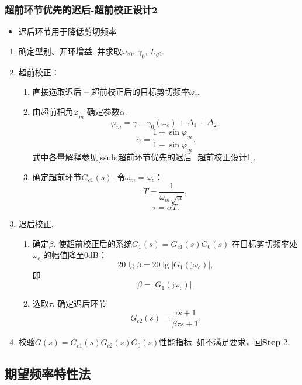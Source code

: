 \documentclass[14pt,a4paper]{article}
\theoremstyle{plain}
\theoremstyle{definition}
\theoremstyle{remark}
\theoremstyle{plain}
\theoremstyle{plain}
\theoremstyle{plain}
\theoremstyle{definition}
\theoremstyle{remark}
\numberwithin{equation}{section}
\begin{document}
			\subsubsection{超前环节优先的迟后-超前校正设计2}%
			\label{ssub:超前环节优先的迟后_超前校正设计2}
			
			\begin{itemize}
				\item 迟后环节用于降低剪切频率
			\end{itemize} 

				\begin{enumerate}
					\item 确定型别、开环增益. 并求取$\omega_{c 0}$, $\gamma_0$, $L_{g 0}$. 
					\item 超前校正：
						\begin{enumerate}
							\item 直接选取迟后 -- 超前校正后的目标剪切频率$ \omega_c$. 
							\item 由超前相角$\varphi_{m}$ 确定参数$\alpha$. 
								\[
									\varphi_{m} = \gamma - \gamma_{0}(\omega_{c}) + \Delta_1 + \Delta_2
								,\] 
								\[
								\alpha = \dfrac{1+\sin\varphi_{m}}{1-\sin\varphi_{m}} 
								.\] 
								式中各量解释参见\ref{ssub:超前环节优先的迟后_超前校正设计1}. 
							\item 确定超前环节$G_{c 1}(s)$. 令$\omega_{m}=\omega_c$：
								\[
								T = \dfrac{1}{\omega_{m}\sqrt{\alpha}}
								,\] 
								\[
								\tau = \alpha T	
								.\]
						\end{enumerate} 
					\item 迟后校正.
						\begin{enumerate}
							\item 确定$\beta $. 使超前校正后的系统$G_1(s) = G_{c 1}(s)G_0(s)$ 在目标剪切频率处$\omega_c$ 的幅值降至0dB： 
								\[
									20\lg \beta = 20\lg \left| G_1(\mathrm{j} \omega_c) \right| 
								,\] 
								即
								\[
								\beta = \left| G_1(\mathrm{j} \omega_c) \right| 
								.\] 
							\item 选取$\tau$, 确定迟后环节
								\[
									G_{c 2}(s) = \dfrac{\tau s+1}{\beta\tau s+1} 
								.\] 
						\end{enumerate} 
					\item 校验$G(s)=G_{c 1}(s)G_{c 2}(s)G_0(s)$性能指标. 如不满足要求，回\textbf{Step} 2.  

				\end{enumerate} 

		\subsection{期望频率特性法}%
		\label{sub:期望频率特性法}
		
\end{document}
